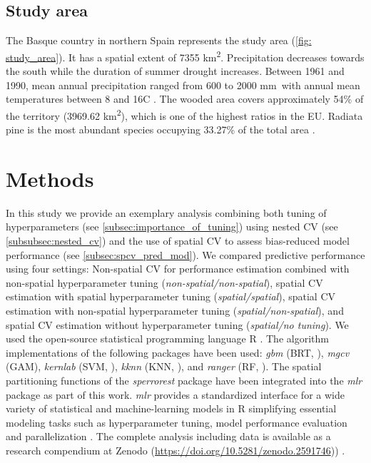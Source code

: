 \documentclass[review]{elsarticle}
\begin{document}
\subsection{Study area}

The Basque country in northern Spain represents the study area (\autoref{fig: study_area}).
It has a spatial extent of 7355 km\textsuperscript{2}.
Precipitation decreases towards the south while the duration of summer drought increases.
Between 1961 and 1990, mean annual precipitation ranged from 600 to 2000 mm\, with annual mean temperatures between 8 and 16\degree C \citep{Ganuza2003}.
The wooded area covers approximately 54\% of the territory (3969.62 km\textsuperscript{2}), which is one of the highest ratios in the EU.
Radiata pine is the most abundant species occupying 33.27\% of the total area \citep{Mugica2016}.

\section{Methods}

\noindent In this study we provide an exemplary analysis combining both tuning of hyperparameters (see \autoref{subsec:importance_of_tuning}) using nested \ac{CV} (see \autoref{subsubsec:nested_cv}) and the use of spatial \ac{CV} to assess bias-reduced model performance (see \autoref{subsec:spcv_pred_mod}).
We compared predictive performance using four settings: Non-spatial \ac{CV} for performance estimation combined with non-spatial hyperparameter tuning (\emph{non-spatial/non-spatial}), spatial \ac{CV} estimation with spatial hyperparameter tuning (\emph{spatial/spatial}), spatial \ac{CV} estimation with non-spatial hyperparameter tuning (\emph{spatial/non-spatial}), and spatial \ac{CV} estimation without hyperparameter tuning (\emph{spatial/no tuning}).
We used the open-source statistical programming language R \citep{R_core}.
The algorithm implementations of the following packages have been used: \textit{gbm} \citep{gbm} (\ac{BRT}, \cite{Elith2008}), \textit{mgcv} \citep{mgcv} (\ac{GAM}), \textit{kernlab} \citep{kernlab} (\ac{SVM}, \cite{Vapnik1998}), \textit{kknn} \citep{kknn} (\ac{KNN}, \cite{Dudani1976}), and \textit{ranger} \citep{ranger} (\ac{RF}, \cite{Breiman2001}). 
The spatial partitioning functions of the \textit{sperrorest} package have been integrated into the \textit{mlr} package as part of this work.
\textit{mlr} provides a standardized interface for a wide variety of statistical and machine-learning models in R simplifying essential modeling tasks such as hyperparameter tuning, model performance evaluation and parallelization \citep{bischlMlrMachineLearning2016}. 
The complete analysis including data is available as a research compendium at Zenodo (\url{https://doi.org/10.5281/zenodo.2591746}))  \citep{schratz_patrick_2019_2591746}.	
\end{document}
